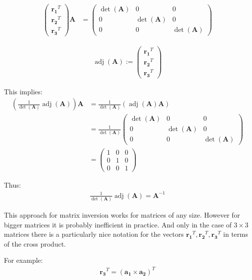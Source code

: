 \documentclass{article}
\newcommand{\vctr}[1]{\mathbf{#1}}
\newcommand{\mat}[1]{\mathbf{#1}}
\newcommand{\matCol}[1]{\vctr{a_{#1}}}
\DeclareMathOperator{\adj}{adj}
\begin{document}
\begin{align*}
\begin{pmatrix}
\vctr{r_1}^T\\
\vctr{r_2}^T\\
\vctr{r_3}^T
\end{pmatrix} \mat{A} &= 
\begin{pmatrix}
\det(\mat{A}) & 0 & 0\\
0 & \det(\mat{A}) & 0\\
0 & 0 & \det(\mat{A})
\end{pmatrix}
\end{align*}

\begin{align*}
\adj(\mat{A}) := \begin{pmatrix}
\vctr{r_1}^T\\
\vctr{r_2}^T\\
\vctr{r_3}^T
\end{pmatrix}
\end{align*}


This implies:
\begin{align*}
\left(\frac{1}{\det(\mat{A})}\adj(\mat{A})\right)\mat{A} &= \frac{1}{\det(\mat{A})}\left(\adj(\mat{A})\mat{A}\right)\\
&=\frac{1}{\det(\mat{A})}\begin{pmatrix}
\det(\mat{A}) & 0 & 0\\
0 & \det(\mat{A}) & 0\\
0 & 0 & \det(\mat{A})
\end{pmatrix}\\
&= \begin{pmatrix}
1& 0 & 0\\
0 & 1 & 0\\
0 & 0 & 1
\end{pmatrix}
\end{align*}

Thus:
\begin{align*}
\frac{1}{\det(\mat{A})}\adj(\mat{A}) = \mat{A}^{-1}
\end{align*}

This approach for matrix inversion works for matrices of any size. However for bigger matrices it is probably inefficient in practice. And only in the case of \(3 \times 3\) matrices there is a particularly nice notation for the vectors \(\vctr{r_1}^T, \vctr{r_2}^T, \vctr{r_3}^T\) in terms of the cross product.

For example:
\begin{align*}
\vctr{r_3}^T = (\matCol{1} \times \matCol{2})^T
\end{align*}
\end{document}
